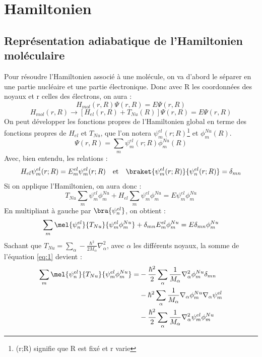 \section{Hamiltonien}

\subsection{Représentation adiabatique de l'Hamiltonien moléculaire}

Pour résoudre l'Hamiltonien associé à une molécule, on va d'abord le séparer en une partie nucléaire et une partie électronique. Donc avec R les coordonnées des noyaux et r celles des électrons, on aura : 
\begin{equation*}
    H_{mol}(r,R)  \Psi(r,R) = E\Psi(r,R)
\end{equation*}
\begin{equation*}
    H_{mol}(r,R) \to [H_{el}(r,R) + T_{Nu}(R)]\Psi(r,R) = E\Psi(r,R)
\end{equation*}
On peut développer les fonctions propres de l'Hamiltonien global en terme des fonctions propres de $H_{el}$ et $T_{Nu}$, que l'on notera $\psi^{el}_m(r;R)$\footnote{(r;R) signifie que R est fixé et r varie} et $\phi^{Nu}_m(R)$.
\begin{equation*}
    \Psi(r,R) = \sum\limits_m \psi^{el}_m(r;R) \phi^{Nu}_m(R)
\end{equation*}
Avec, bien entendu, les relations : 
\begin{equation*}
    H_{el}\psi^{el}_m(r;R) = E^{el}_m\psi^{el}_m(r;R) \quad \textrm{et} \quad \braket{\psi^{el}_m(r;R)}{\psi^{el}_n(r;R)} = \delta_{mn} 
\end{equation*}
Si on applique l'Hamiltonien, on aura donc :
\begin{equation*}
    T_{Nu} \sum\limits_m \psi^{el}_m \phi^{Nu}_m + H_{el}\sum\limits_m \psi^{el}_m \phi^{Nu}_m  = E\psi^{el}_m\phi^{Nu}_m
\end{equation*}
En multipliant à gauche par $\bra{\psi^{el}_n}$, on obtient :
\begin{equation}\label{eq:1}
    \sum\limits_m \mel{\psi^{el}_n}{T_{Nu}}{\psi^{el}_m \phi^{Nu}_m} + \delta_{mn}E^{el}_m\phi^{Nu}_m = E \delta_{mn}\phi^{Nu}_m
\end{equation}
Sachant que $T_{Nu} = \sum\limits_{\alpha}-\frac{\hbar^2}{2M_{\alpha}}\nabla_{\alpha}^2$, avec $\alpha$ les différents noyaux, la somme de l'équation \ref{eq:1} devient :
\begin{equation}\label{eq:2}
\begin{split}
    \sum\limits_m \mel{\psi^{el}_n}{T_{Nu}}{\psi^{el}_m \phi^{Nu}_m} = & - \frac{\hbar^2}{2}\sum\limits_{\alpha}\frac{1}{M_{\alpha}}\nabla_{\alpha}^2\phi^{Nu}_m\delta_{mn} \\
    & - \hbar^2\sum\limits_{\alpha}\frac{1}{M_{\alpha}}\nabla_{\alpha}\phi^{Nu}_m\nabla_{\alpha}\psi^{el}_m \\
    & - \frac{\hbar^2}{2}\sum\limits_{\alpha}\frac{1}{M_{\alpha}}\nabla_{\alpha}^2\psi^{el}_m\phi^{Nu}_m    
\end{split}
\end{equation}
